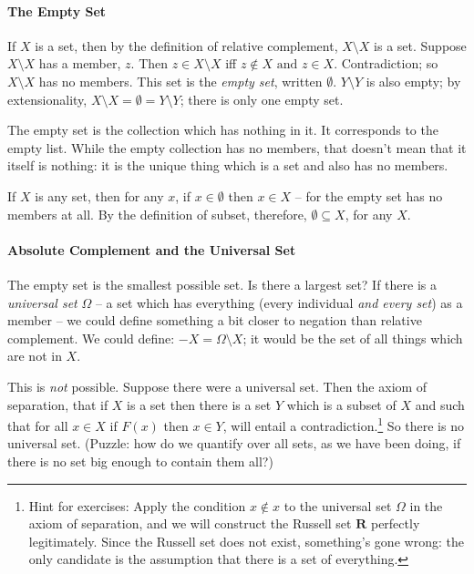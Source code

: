 \paragraph{The Empty Set}

If $X$ is a set, then by the definition of relative complement, $X\setminus X$ is a set. Suppose $X\setminus X$ has a member, $z$.  Then 	$z\in X\setminus X$ iff $z \notin X \text{ and } z \in X$. Contradiction; so $X\setminus X$ has no members. This set is the \emph{empty set}, written $\emptyset$. $Y\setminus Y$ is also empty; by extensionality, $X\setminus X=\emptyset=Y\setminus Y$; there is only one empty set.

The empty set is the collection which has nothing in it. It corresponds to the empty list. While the empty collection has no members, that doesn't mean that it itself is nothing: it is the unique thing which is a set and also has no members. 

 If $X$ is any set, then for any $x$, if $x \in \emptyset$ then $x\in X$ – for the empty set has no members at all. By the definition of subset, therefore, $\emptyset \subseteq X$, for any $X$.

\paragraph{Absolute Complement and the Universal Set}

The empty set is the smallest possible set. Is there a largest set? If there is a \emph{universal set} $\Omega$ – a set which has everything (every individual \emph{and every set}) as a member – we could define something a bit closer to negation than relative complement. We could define: $-X = \Omega \setminus X$; it would be the set of all things which are not in $X$.

This is \emph{not} possible. Suppose there were a universal set. Then the axiom of separation, that if $X$ is a set then there is a set $Y$ which is a subset of $X$ and such that for all $x\in X$ if $F(x)$ then $x\in Y$, will entail a contradiction.\footnote{Hint for exercises: Apply the condition $x\notin x$ to the universal set $\Omega$ in the axiom of separation, and we will construct the Russell set $\mathbf{R}$ perfectly legitimately. Since the Russell set does not exist, something's gone wrong: the only candidate is the assumption that there is a set of everything.} So there is no universal set. (Puzzle: how do we quantify over all sets, as we have been doing, if there is no set big enough to contain them all?)

